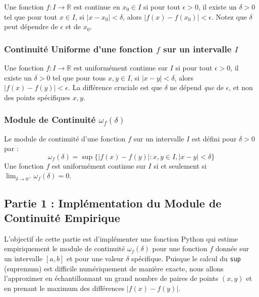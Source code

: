 \documentclass[12pt,a4paper]{report}
\begin{document}
Une fonction $f: I \to \mathbb{R}$ est continue en $x_0 \in I$ si pour tout $\epsilon > 0$, il existe un $\delta > 0$ tel que pour tout $x \in I$, si $|x - x_0| < \delta$, alors $|f(x) - f(x_0)| < \epsilon$.
Notez que $\delta$ peut dépendre de $\epsilon$ et de $x_0$.

\subsubsection{Continuité Uniforme d'une fonction $f$ sur un intervalle $I$}

Une fonction $f: I \to \mathbb{R}$ est uniformément continue sur $I$ si pour tout $\epsilon > 0$, il existe un $\delta > 0$ tel que pour tous $x, y \in I$, si $|x - y| < \delta$, alors $|f(x) - f(y)| < \epsilon$.
La différence cruciale est que $\delta$ ne dépend \textit{que} de $\epsilon$, et non des points spécifiques $x, y$.

\subsubsection{Module de Continuité $\omega_f(\delta)$}

Le module de continuité d'une fonction $f$ sur un intervalle $I$ est défini pour $\delta > 0$ par :
$$ \omega_f(\delta) = \sup \{ |f(x) - f(y)| : x, y \in I, |x - y| < \delta \} $$
Une fonction $f$ est uniformément continue sur $I$ si et seulement si $\lim_{\delta \to 0^+} \omega_f(\delta) = 0$.

\subsection{Partie 1 : Implémentation du Module de Continuité Empirique}

L'objectif de cette partie est d'implémenter une fonction Python qui estime empiriquement le module de continuité $\omega_f(\delta)$ pour une fonction $f$ donnée sur un intervalle $[a, b]$ et pour une valeur $\delta$ spécifique. Puisque le calcul du \texttt{sup} (supremum) est difficile numériquement de manière exacte, nous allons l'approximer en échantillonnant un grand nombre de paires de points $(x, y)$ et en prenant le maximum des différences $|f(x) - f(y)|$.
\end{document}
